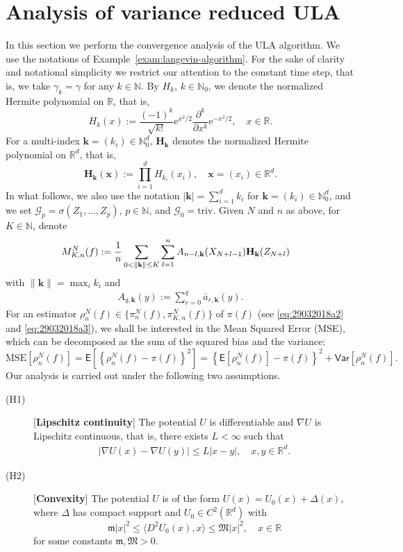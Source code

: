 \documentclass[bj]{imsart}
\def\PE{\mathsf{E}}
\def\PVar{\mathsf{Var}}
\newcommand{\ps}[2]{\langle #1, #2 \rangle}
\def\nset{\mathbb{N}}
\def\rset{\mathbb{R}}
\def\rme{\mathrm{e}}
\def\rset{\mathbb{R}}
\begin{document}
\section{Analysis of variance reduced ULA}\label{sec:ula_analysis}
In this section we perform the convergence analysis of the ULA algorithm. We use the notations of Example~\ref{exam:langevin-algorithm}. For the sake of clarity and notational simplicity we restrict our attention to the constant time step, that is, we take $\gamma_k =\gamma$ for any $k \in \nset$.
By $H_k$, $k\in\mathbb N_0$,
we denote the normalized Hermite polynomial on $\mathbb R$, that is,
$$
H_k(x):=\frac{(-1)^k}{\sqrt{k!}}\rme^{x^2/2}\frac{\partial^k}{\partial x^k}\rme^{-x^2/2},
\quad x\in\mathbb R.
$$
For a multi-index $\mathbf{k}=(k_i)\in\mathbb N_0^d$,
$\mathbf{H}_\mathbf{k}$ denotes the normalized Hermite polynomial on $\mathbb R^d$, that is,
$$
\mathbf{H}_\mathbf{k}(\mathbf{x}):=\prod_{i=1}^d H_{k_i}(x_i),\quad \mathbf{x}=(x_i)\in\mathbb R^d.
$$
In what follows, we also use the notation
$|\mathbf{k}|=\sum_{i=1}^d k_i$ for $\mathbf{k}=(k_i)\in\mathbb N_0^d$,
and we set $\mathcal G_p=\sigma(Z_1,\ldots,Z_p)$, $p\in\mathbb N$, and $\mathcal G_0=\mathrm{triv}$.
Given $N$ and $n$ as above, for $K\in\mathbb N$, denote
\begin{align}
M_{K,n}^N(f) & :=\frac{1}{n}\sum_{ 0<\|\mathbf{k}\|\le K}\sum_{l=1}^{n}A_{n-l,\mathbf{k}}(X_{N+l-1})\mathbf{H}_\mathbf{k}(Z_{N+l})
\label{eq:29032018a5}
\notag
\end{align}
with \(\|\mathbf{k}\|=\max_{i} k_i\) and
\begin{eqnarray}
\label{eq:A-ula}
A_{q,\mathbf{k}}(y):=\sum_{r=0}^{ q } \bar{a}_{r,\mathbf{k}}(y).
\end{eqnarray}
For an estimator $\rho_n^N(f)\in\{\pi_n^N(f),\pi_{K,n}^N(f)\}$
of $\pi(f)$ (see \eqref{eq:29032018a2} and \eqref{eq:29032018a3}), we shall be interested in the Mean Squared Error (MSE),
which can be decomposed as the sum of the squared  bias
and the  variance:
\begin{equation}
\label{eq:29032018a4}
\mathrm{MSE}\left[\rho_n^N(f)\right] = \PE\left[\left\{\rho_n^N(f)-\pi(f)\right\}^2\right]
=\left\{\PE[\rho_n^N(f)]-\pi(f)\right\}^2 +\PVar[\rho_n^N(f)].
\end{equation}
Our analysis is carried out under the following two assumptions.
\begin{description}
\item[(H1)][\textbf{Lipschitz continuity}] The potential $U$ is differentiable and $\nabla U$ is Lipschitz continuous, that is, there exists $L < \infty$ such that
\begin{eqnarray*}
| \nabla U(x)-\nabla U(y) | \leq L |x-y|, \quad x,y\in \rset^d.
\end{eqnarray*}
\item[(H2)][\textbf{Convexity}] The potential $U$ is of the form $U(x)=U_0(x)+\Delta(x),$ where $\Delta$ has  compact support and $U_0\in C^2(\mathbb{R}^d)$ with
\begin{equation*}
\mathfrak{m} |x|^2 \leq \ps{D^2U_0(x)}{x} \leq \mathfrak{M} |x|^2,\quad   x\in \mathbb{R}
\end{equation*}
for some constants $\mathfrak{m},\mathfrak{M}>0.$
\end{description}
\end{document}

